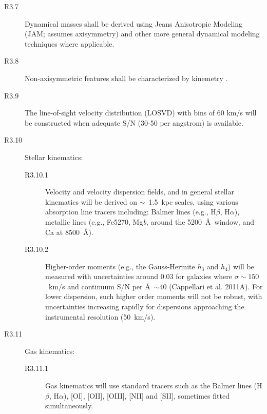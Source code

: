 \documentclass[preprint,11pt]{aastex}
\newcommand{\Halpha}{{H$\alpha$}}
\newcommand{\Hbeta}{{H$\beta$}}
\newcommand{\Mgb}{Mg{\it b}}
\begin{document}
\begin{description}


\item[R3.7]  Dynamical masses shall be derived using Jeans Anisotropic
  Modeling (JAM; assumes axisymmetry) and other more general dynamical modeling
  techniques where applicable.

\item[R3.8] Non-axisymmetric features shall be characterized by
  kinemetry \citep{krajnovic2006}.

\item[R3.9]  The line-of-sight velocity distribution (LOSVD) with bins of 60 km/s will be constructed when
  adequate S/N (30-50 per angstrom) is available.

\item[R3.10]  Stellar kinematics:

\begin{description}

\item[R3.10.1]  Velocity and velocity dispersion fields, and in general
  stellar kinematics will be derived on $\sim$~1.5~kpc scales, using
  various absorption line tracers including: Balmer lines (e.g.,
  \Hbeta, \Halpha), metallic lines (e.g., Fe5270, \Mgb, around the
  5200~\AA\ window, and Ca at 8500~\AA).

\item[R3.10.2]  Higher-order moments (e.g., the Gauss-Hermite $h_3$ and $h_4$)
  will be measured with uncertainties around 0.03 for galaxies where
  $\sigma \sim 150$~km/s and continuum S/N per \AA\ $\sim$40
  (Cappellari et al. 2011A). For lower dispersion, such higher order
  moments will not be robust, with uncertainties increasing rapidly
  for dispersions approaching the instrumental resolution (50~km/s).

\end{description}

\item[R3.11]  Gas kinematics:

\begin{description}

\item[R3.11.1]  Gas kinematics will use standard tracers such as the Balmer
  lines (\Hbeta, \Halpha), [OI], [OII], [OIII], [NII] and [SII],
  sometimes fitted simultaneously. 


\end{description}
\end{description}
\end{document}
